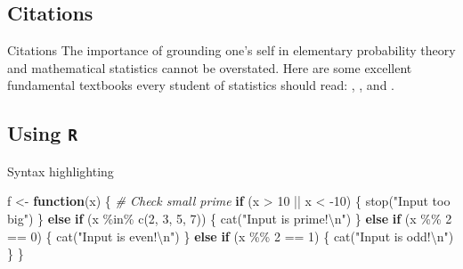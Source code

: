 \documentclass[,aspectratio=43]{beamer}
\newenvironment{Shaded}{\begin{snugshade}}{\end{snugshade}}
\newcommand{\CommentTok}[1]{\textcolor[rgb]{0.56,0.35,0.01}{\textit{#1}}}
\newcommand{\ControlFlowTok}[1]{\textcolor[rgb]{0.13,0.29,0.53}{\textbf{#1}}}
\newcommand{\DecValTok}[1]{\textcolor[rgb]{0.00,0.00,0.81}{#1}}
\newcommand{\FunctionTok}[1]{\textcolor[rgb]{0.00,0.00,0.00}{#1}}
\newcommand{\NormalTok}[1]{#1}
\newcommand{\OtherTok}[1]{\textcolor[rgb]{0.56,0.35,0.01}{#1}}
\newcommand{\SpecialCharTok}[1]{\textcolor[rgb]{0.00,0.00,0.00}{#1}}
\newcommand{\StringTok}[1]{\textcolor[rgb]{0.31,0.60,0.02}{#1}}
\begin{document}
\hypertarget{citations}{%
\subsection{Citations}\label{citations}}

\begin{frame}{Citations}
The importance of grounding one's self in elementary probability theory
and mathematical statistics cannot be overstated. Here are some
excellent fundamental textbooks every student of statistics should read:
\textcite{casella2002statistical}, \textcite{pawitan2001all}, and
\textcite{wasserman2013all}.

\end{frame}

\hypertarget{using-r}{%
\subsection{\texorpdfstring{Using \texttt{R}}{Using R}}\label{using-r}}

\begin{frame}[fragile]{Syntax highlighting}
\protect\hypertarget{syntax-highlighting}{}
\begin{Shaded}
\begin{Highlighting}[]
\NormalTok{f }\OtherTok{\textless{}{-}} \ControlFlowTok{function}\NormalTok{(x) \{}
  \CommentTok{\# Check small prime}
  \ControlFlowTok{if}\NormalTok{ (x }\SpecialCharTok{\textgreater{}} \DecValTok{10} \SpecialCharTok{||}\NormalTok{ x }\SpecialCharTok{\textless{}} \SpecialCharTok{{-}}\DecValTok{10}\NormalTok{) \{}
    \FunctionTok{stop}\NormalTok{(}\StringTok{"Input too big"}\NormalTok{)}
\NormalTok{  \} }\ControlFlowTok{else} \ControlFlowTok{if}\NormalTok{ (x }\SpecialCharTok{\%in\%} \FunctionTok{c}\NormalTok{(}\DecValTok{2}\NormalTok{, }\DecValTok{3}\NormalTok{, }\DecValTok{5}\NormalTok{, }\DecValTok{7}\NormalTok{)) \{}
    \FunctionTok{cat}\NormalTok{(}\StringTok{"Input is prime!}\SpecialCharTok{\textbackslash{}n}\StringTok{"}\NormalTok{)}
\NormalTok{  \} }\ControlFlowTok{else} \ControlFlowTok{if}\NormalTok{ (x }\SpecialCharTok{\%\%} \DecValTok{2} \SpecialCharTok{==} \DecValTok{0}\NormalTok{) \{}
    \FunctionTok{cat}\NormalTok{(}\StringTok{"Input is even!}\SpecialCharTok{\textbackslash{}n}\StringTok{"}\NormalTok{)}
\NormalTok{  \} }\ControlFlowTok{else} \ControlFlowTok{if}\NormalTok{ (x }\SpecialCharTok{\%\%} \DecValTok{2} \SpecialCharTok{==} \DecValTok{1}\NormalTok{) \{}
    \FunctionTok{cat}\NormalTok{(}\StringTok{"Input is odd!}\SpecialCharTok{\textbackslash{}n}\StringTok{"}\NormalTok{)}
\NormalTok{  \}}
\NormalTok{\}}
\end{Highlighting}
\end{Shaded}
\end{frame}
\end{document}
